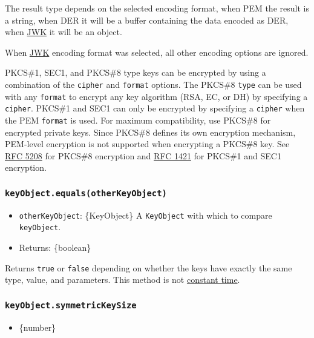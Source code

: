 The result type depends on the selected encoding format, when PEM the
result is a string, when DER it will be a buffer containing the data
encoded as DER, when \href{https://tools.ietf.org/html/rfc7517}{JWK} it
will be an object.

When \href{https://tools.ietf.org/html/rfc7517}{JWK} encoding format was
selected, all other encoding options are ignored.

PKCS\#1, SEC1, and PKCS\#8 type keys can be encrypted by using a
combination of the \texttt{cipher} and \texttt{format} options. The
PKCS\#8 \texttt{type} can be used with any \texttt{format} to encrypt
any key algorithm (RSA, EC, or DH) by specifying a \texttt{cipher}.
PKCS\#1 and SEC1 can only be encrypted by specifying a \texttt{cipher}
when the PEM \texttt{format} is used. For maximum compatibility, use
PKCS\#8 for encrypted private keys. Since PKCS\#8 defines its own
encryption mechanism, PEM-level encryption is not supported when
encrypting a PKCS\#8 key. See
\href{https://www.rfc-editor.org/rfc/rfc5208.txt}{RFC 5208} for PKCS\#8
encryption and \href{https://www.rfc-editor.org/rfc/rfc1421.txt}{RFC
1421} for PKCS\#1 and SEC1 encryption.

\subsubsection{\texorpdfstring{\texttt{keyObject.equals(otherKeyObject)}}{keyObject.equals(otherKeyObject)}}\label{keyobject.equalsotherkeyobject}

\begin{itemize}
\tightlist
\item
  \texttt{otherKeyObject}: \{KeyObject\} A \texttt{KeyObject} with which
  to compare \texttt{keyObject}.
\item
  Returns: \{boolean\}
\end{itemize}

Returns \texttt{true} or \texttt{false} depending on whether the keys
have exactly the same type, value, and parameters. This method is not
\href{https://en.wikipedia.org/wiki/Timing_attack}{constant time}.

\subsubsection{\texorpdfstring{\texttt{keyObject.symmetricKeySize}}{keyObject.symmetricKeySize}}\label{keyobject.symmetrickeysize}

\begin{itemize}
\tightlist
\item
  \{number\}
\end{itemize}

